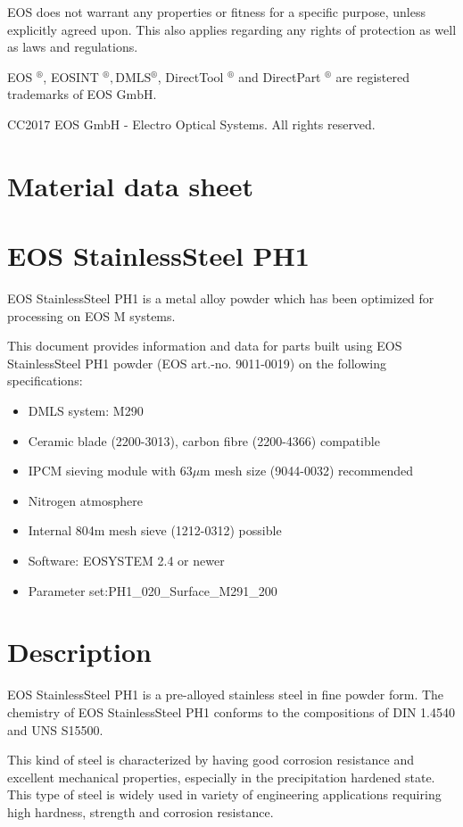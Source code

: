 \documentclass[10pt]{article}
\begin{document}
EOS does not warrant any properties or fitness for a specific purpose, unless explicitly agreed upon. This also applies regarding any rights of protection as well as laws and regulations.

EOS ${ }^{\circledR}$, EOSINT ${ }^{\circledR}, \mathrm{DMLS}{ }^{\circledR}$, DirectTool ${ }^{\circledR}$ and DirectPart ${ }^{\circledR}$ are registered trademarks of EOS $\mathrm{GmbH}$.

CC2017 EOS GmbH - Electro Optical Systems. All rights reserved.

\section*{Material data sheet}
\section*{EOS StainlessSteel PH1}
EOS StainlessSteel PH1 is a metal alloy powder which has been optimized for processing on EOS M systems.

This document provides information and data for parts built using EOS StainlessSteel PH1 powder (EOS art.-no. 9011-0019) on the following specifications:

\begin{itemize}
  \item DMLS system: M290
  \item Ceramic blade (2200-3013), carbon fibre (2200-4366) compatible
  \item IPCM sieving module with $63 \mu \mathrm{m}$ mesh size (9044-0032) recommended
  \item Nitrogen atmosphere
  \item Internal 804m mesh sieve (1212-0312) possible
  \item Software: EOSYSTEM 2.4 or newer
  \item Parameter set:PH1\_020\_Surface\_M291\_200
\end{itemize}

\section*{Description}
EOS StainlessSteel PH1 is a pre-alloyed stainless steel in fine powder form. The chemistry of EOS StainlessSteel PH1 conforms to the compositions of DIN 1.4540 and UNS S15500.

This kind of steel is characterized by having good corrosion resistance and excellent mechanical properties, especially in the precipitation hardened state. This type of steel is widely used in variety of engineering applications requiring high hardness, strength and corrosion resistance.
\end{document}
